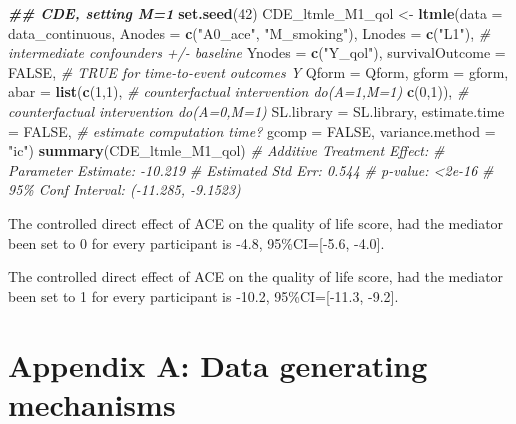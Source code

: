 \documentclass[
]{book}
\newenvironment{Shaded}{\begin{snugshade}}{\end{snugshade}}
\newcommand{\AttributeTok}[1]{\textcolor[rgb]{0.13,0.29,0.53}{#1}}
\newcommand{\CommentTok}[1]{\textcolor[rgb]{0.56,0.35,0.01}{\textit{#1}}}
\newcommand{\ConstantTok}[1]{\textcolor[rgb]{0.56,0.35,0.01}{#1}}
\newcommand{\DecValTok}[1]{\textcolor[rgb]{0.00,0.00,0.81}{#1}}
\newcommand{\DocumentationTok}[1]{\textcolor[rgb]{0.56,0.35,0.01}{\textbf{\textit{#1}}}}
\newcommand{\FunctionTok}[1]{\textcolor[rgb]{0.13,0.29,0.53}{\textbf{#1}}}
\newcommand{\NormalTok}[1]{#1}
\newcommand{\OtherTok}[1]{\textcolor[rgb]{0.56,0.35,0.01}{#1}}
\newcommand{\StringTok}[1]{\textcolor[rgb]{0.31,0.60,0.02}{#1}}
\begin{document}
\begin{Shaded}
\begin{Highlighting}[]
\DocumentationTok{\#\# CDE, setting M=1}
\FunctionTok{set.seed}\NormalTok{(}\DecValTok{42}\NormalTok{)}
\NormalTok{CDE\_ltmle\_M1\_qol }\OtherTok{\textless{}{-}} \FunctionTok{ltmle}\NormalTok{(}\AttributeTok{data =}\NormalTok{ data\_continuous,}
                          \AttributeTok{Anodes =} \FunctionTok{c}\NormalTok{(}\StringTok{"A0\_ace"}\NormalTok{, }\StringTok{"M\_smoking"}\NormalTok{),}
                          \AttributeTok{Lnodes =} \FunctionTok{c}\NormalTok{(}\StringTok{"L1"}\NormalTok{), }\CommentTok{\# intermediate confounders +/{-} baseline}
                          \AttributeTok{Ynodes =} \FunctionTok{c}\NormalTok{(}\StringTok{"Y\_qol"}\NormalTok{),}
                          \AttributeTok{survivalOutcome =} \ConstantTok{FALSE}\NormalTok{, }\CommentTok{\# TRUE for time{-}to{-}event outcomes Y}
                          \AttributeTok{Qform =}\NormalTok{ Qform,}
                          \AttributeTok{gform =}\NormalTok{ gform,}
                          \AttributeTok{abar =} \FunctionTok{list}\NormalTok{(}\FunctionTok{c}\NormalTok{(}\DecValTok{1}\NormalTok{,}\DecValTok{1}\NormalTok{), }\CommentTok{\# counterfactual intervention do(A=1,M=1)}
                                      \FunctionTok{c}\NormalTok{(}\DecValTok{0}\NormalTok{,}\DecValTok{1}\NormalTok{)), }\CommentTok{\# counterfactual intervention do(A=0,M=1)}
                          \AttributeTok{SL.library =}\NormalTok{ SL.library,}
                          \AttributeTok{estimate.time =} \ConstantTok{FALSE}\NormalTok{, }\CommentTok{\# estimate computation time?}
                          \AttributeTok{gcomp =} \ConstantTok{FALSE}\NormalTok{,}
                          \AttributeTok{variance.method =} \StringTok{"ic"}\NormalTok{)}
\FunctionTok{summary}\NormalTok{(CDE\_ltmle\_M1\_qol)}
\CommentTok{\# Additive Treatment Effect:}
\CommentTok{\#   Parameter Estimate:  {-}10.219}
\CommentTok{\#    Estimated Std Err:  0.544}
\CommentTok{\#              p{-}value:  \textless{}2e{-}16}
\CommentTok{\#    95\% Conf Interval: ({-}11.285, {-}9.1523)}
\end{Highlighting}
\end{Shaded}

The controlled direct effect of ACE on the quality of life score, had the mediator been set to 0 for every participant is -4.8, 95\%CI={[}-5.6, -4.0{]}.

The controlled direct effect of ACE on the quality of life score, had the mediator been set to 1 for every participant is -10.2, 95\%CI={[}-11.3, -9.2{]}.

\chapter{Appendix A: Data generating mechanisms}\label{appendix_a}
\end{document}
